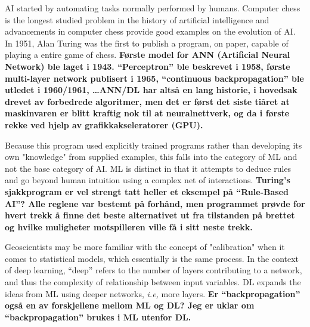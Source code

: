 \documentclass{article}
\begin{document}
AI started by automating tasks normally performed by humans. Computer chess is the longest studied problem in the history of artificial intelligence and advancements in computer chess provide good examples on the evolution of AI. In 1951, Alan Turing was the first to publish a program, on paper, capable of playing a entire game of chess. 
\textbf{Første model for ANN (Artificial Neural Network) ble laget i 1943. ``Perceptron'' ble beskrevet i 1958, første multi-layer network publisert i 1965, ``continuous backpropagation'' ble utledet i 1960/1961, \ldots ANN/DL har altså en lang historie, i hovedsak drevet av forbedrede algoritmer, men det er først det siste tiåret at maskinvaren er blitt kraftig nok til at neuralnettverk, og da i første rekke ved hjelp av grafikkakseleratorer (GPU).}

Because this program used explicitly trained programs rather than developing its own "knowledge" from supplied examples, this falls into the category of ML and not the base category of AI. ML is distinct in that it attempts to deduce rules and go beyond human intuition using a complex net of interactions. 
\textbf{Turing's sjakkprogram er vel strengt tatt heller et eksempel på ``Rule-Based AI''? Alle reglene var bestemt på forhånd, men programmet prøvde for hvert trekk å finne det beste alternativet ut fra tilstanden på brettet og hvilke muligheter motspilleren ville få i sitt neste trekk.}

Geoscientists may be more familiar with the concept of "calibration" when it comes to statistical models, which essentially is the same process. In the context of deep learning, ``deep'' refers to the number of layers contributing to a network, and thus the complexity of relationship between input variables. DL expands the ideas from ML using deeper networks, \textit{i.e,} more layers.
\textbf{Er ``backpropagation'' også en av forskjellene mellom ML og DL? Jeg er uklar om ``backpropagation'' brukes i ML utenfor DL.}
\end{document}
